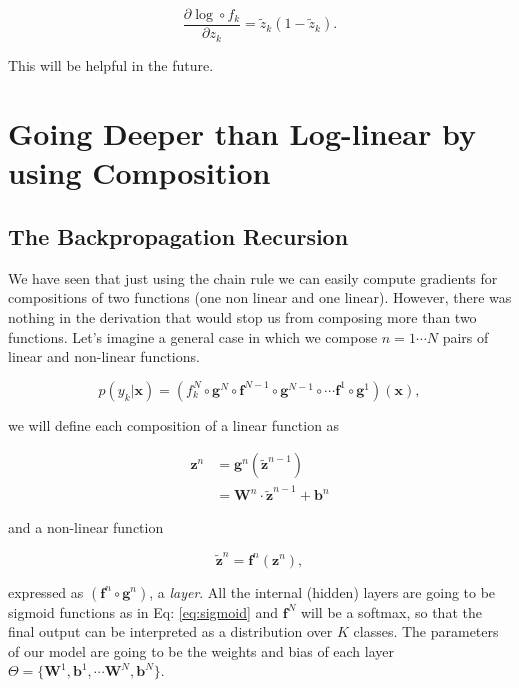 \begin{equation}
\frac{\partial \log \circ f_{k}}{\partial z_{k}} = \tilde{z}_{k} (1-\tilde{z}_{k}).
\label{eq:partsigmoid}
\end{equation}

\noindent This will be helpful in the future.

\section{Going Deeper than Log-linear by using Composition}

\subsection{The Backpropagation Recursion}

We have seen that just using the chain rule we can easily compute gradients for
compositions of two functions (one non linear and one linear). However, there
was nothing in the derivation that would stop us from composing more than two
functions. Let's imagine a general case in which we compose $n=1 \cdots N$
pairs of linear and non-linear functions.

\begin{equation}
p(y_k|\mathbf{x}) = (f_k^N \circ \mathbf{g}^N \circ \mathbf{f}^{N-1} \circ \mathbf{g}^{N-1} \circ \cdots \mathbf{f}^1 \circ \mathbf{g}^1)(\mathbf{x}),
\end{equation}

\noindent we will define each composition of a linear function as

\begin{align}
\mathbf{z}^n & = \mathbf{g}^n(\tilde{\mathbf{z}}^{n-1})\nonumber\\ &= \mathbf{W}^n \cdot \tilde{\mathbf{z}}^{n-1} + \mathbf{b}^n 
\end{align}

\noindent and a non-linear function 

\begin{equation}
\tilde{\mathbf{z}}^n = \mathbf{f}^n(\mathbf{z}^n),
\end{equation}

expressed as $(\mathbf{f}^n \circ \mathbf{g}^n)$, a \textit{layer}. All the
internal (hidden) layers are going to be sigmoid functions as in Eq:
\ref{eq:sigmoid} and $\mathbf{f}^N$ will be a softmax, so that the final output
can be interpreted as a distribution over $K$ classes. The parameters of our
model are going to be the weights and bias of each layer
$\Theta=\{\mathbf{W}^1, \mathbf{b}^1, \cdots \mathbf{W}^N, \mathbf{b}^N\}$.  

